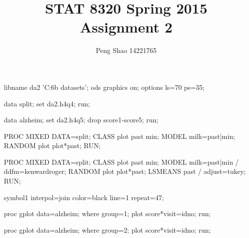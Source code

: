\documentclass[letterpaper, 12pt]{article}
\begin{document}
\title{STAT 8320 Spring 2015 Assignment 2}
\author{Peng Shao 14221765}
\maketitle
\indent



\begin{Sascode}[store=class]
libname da2 'C:\Users\psy6b\Desktop{} datasets';
ods graphics on;
options ls=70 ps=35;

data split;
set da2.h4q4;
run;

data alzheim;
set da2.h4q5;
drop score1-score5;
run;

PROC MIXED DATA=split;
CLASS plot past min;
MODEL milk=past|min;
RANDOM plot plot*past;
RUN;

PROC MIXED DATA=split;
CLASS plot past min;
MODEL milk=past|min / ddfm=kenwardroger;
RANDOM plot plot*past;
LSMEANS past / adjust=tukey;
RUN;

symbol1 interpol=join color=black line=1 repeat=47;

proc gplot data=alzheim;
where group=1;
plot score*visit=idno;
run;

proc gplot data=alzheim;
where group=2;
plot score*visit=idno;
run;
\end{Sascode}



\end{document}
